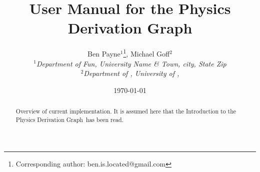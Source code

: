 \documentclass{article}
\newcommand{\pdg}{Physics Derivation Graph}
\begin{document}
\title{User Manual for the \pdg}

\author{Ben Payne$^{1}$\footnote{Corresponding author: ben.is.located@gmail.com}, Michael Goff$^{2}$\\
{\it $^{1}$Department of Fun, University Name \& Town, city, State Zip}\\
{\it $^{2}$Department of , University of ,  }}

\date{\today}


\maketitle %
\begin{abstract}
Overview of current implementation. It is assumed here that the Introduction to the \pdg\ has been read. 
\end{abstract}
\end{document}
